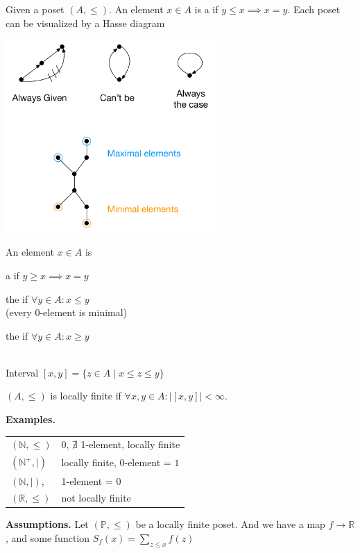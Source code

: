 \begin{definition}
Given a poset $(A, \leq)$.
An element $x \in A$ is a  if $y \leq x \implies x=y$.
Each poset can be visualized by a Hasse diagram

\begin{center}
    \includegraphics[width=0.6\textwidth]{02_higher_combinatorics/pics/Lattice}
\end{center}

An element $x \in A$ is
\begin{compactitem}
  \item a  if $y \geq x \implies x=y$
  \item the  if $\forall y \in A : x \leq y$ \\
    (every 0-element is minimal)
  \item the  if $\forall y \in A : x \geq y$
\end{compactitem}~\\
Interval $[x,y] = \{z \in A \mid x \leq z \leq y\}$

$(A, \leq)$ is locally finite if $\forall x,y \in A: | [x,y]| < \infty$.
\end{definition}

\textbf{Examples.} \\
\begin{tabular}{ll}
  $(\mathbb{N}, \leq)$
    & 0, $\nexists$ 1-element, locally finite \\
  $(\mathbb{N}^{+}, \mid)$
    & locally finite, 0-element = $1$ \\
  $(\mathbb{N}, \mid)$,
    & 1-element = $0$ \\
  $(\mathbb{R}, \leq)$
    & not locally finite
\end{tabular}

\textbf{Assumptions.}
Let $(\mathbb{P}, \leq)$ be a locally finite poset. And we have a map $f \rightarrow \mathbb{R}$, and some function $S_f(x) = \sum_{z \leq x} f(z)$

